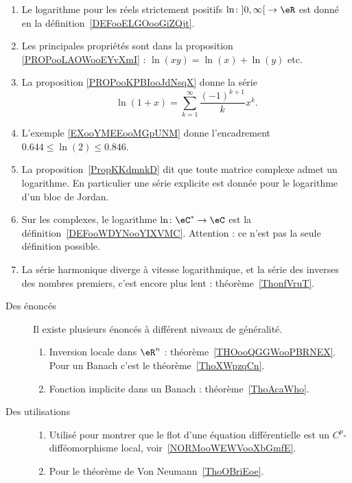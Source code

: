 \begin{enumerate}
    \item
    Le logarithme pour les réels strictement positifs \( \ln\colon \mathopen] 0 , \infty \mathclose[\to \eR\) est donné en la définition~\ref{DEFooELGOooGiZQjt}.
    \item
        Les principales propriétés sont dans la proposition \ref{PROPooLAOWooEYvXmI} : \( \ln(xy)=\ln(x)+\ln(y)\) etc.
    \item
        La proposition \ref{PROPooKPBIooJdNsqX} donne la série
        \begin{equation}
            \ln(1+x)=\sum_{k=1}^{\infty}\frac{ (-1)^{k+1} }{ k }x^k.
        \end{equation}
    \item
        L'exemple \ref{EXooYMEEooMGpUNM} donne l'encadrement \( 0.644\leq \ln(2)\leq 0.846\).
    \item
        La proposition~\ref{PropKKdmnkD} dit que toute matrice complexe admet un logarithme. En particulier une série explicite est donnée pour le logarithme d'un bloc de Jordan.
    \item
        Sur les complexes, le logarithme \( \ln \colon \eC^*\to \eC\) est la définition~\ref{DEFooWDYNooYIXVMC}. Attention : ce n'est pas la seule définition possible.
    \item
        La série harmonique diverge à vitesse logarithmique, et la série des inverses des nombres premiers, c'est encore plus lent : théorème~\ref{ThonfVruT}.
\end{enumerate}

       \begin{description}
           \item[Des énoncés]
               Il existe plusieurs énoncés à différent niveaux de généralité.
               \begin{enumerate}
    \item Inversion locale dans \( \eR^n\) : théorème~\ref{THOooQGGWooPBRNEX}. Pour un Banach c'est le théorème~\ref{ThoXWpzqCn}.
    \item
        Fonction implicite dans un Banach : théorème~\ref{ThoAcaWho}.
               \end{enumerate}
           \item[Des utilisations]
               \begin{enumerate}

    \item
        Utilisé pour montrer que le flot d'une équation différentielle est un \( C^p\)-difféomorphisme local, voir~\ref{NORMooWEWVooXbGmfE}. %
    \item
        Pour le théorème de Von Neumann~\ref{ThoOBriEoe}.
               \end{enumerate}
       \end{description}

